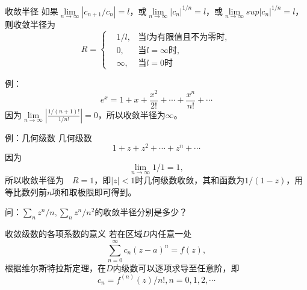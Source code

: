 \documentclass[11pt]{beamer}
\newcommand{\kong}[1][0.5]{\vspace{#1cm}}
\begin{document}
\begin{frame}{收敛半径}
如果$\lim\limits_{n \rightarrow \infty} | c_{n+1} / c_n | = l$，或$\lim\limits_{n \rightarrow \infty}　|c_n|^{1/n} = l$，或$\lim\limits_{n \rightarrow \infty}sup |c_n|^{1/n} = l$，
则收敛半径为
\begin{equation}
R = \left\{
\begin{aligned}
&1/l, 	&\text{当$l$为有限值且不为零时}, \\
&0, 	&\text{当$l=\infty$时}, \\
&\infty, &\text{当$l=0$时}
\end{aligned}
\right.
\end{equation}

\kong[1]
例：
\begin{equation}
e^x = 1 + x + \frac{x^2}{2!} + \cdots + \frac{x^n}{n!} + \cdots
\end{equation}
因为$\lim\limits_{n \rightarrow \infty} | \frac{1/(n+1)!}{1/n!}| = 0$，所以收敛半径为$\infty$。
\end{frame}

\begin{frame}{例：几何级数}
几何级数
\begin{equation}
1 + z + z^2 + \cdots + z^n + \cdots
\end{equation}
因为
\begin{equation}
\lim\limits_{n \rightarrow \infty} 1/1 = 1,
\end{equation}
所以收敛半径为　$R=1$，即$ |z|<1$时几何级数收敛，其和函数为$1/(1-z)$，用等比数列前$n$项和取极限即可得到。

\kong[0.5]
问：$\sum_n z^n/n, \sum_n z^n/n^2$的收敛半径分别是多少？
\end{frame}

\begin{frame}{收敛级数的各项系数的意义}
若在区域$D$内任意一处
\begin{equation}
\sum_{n=0}^{\infty} c_n (z-a)^n = f(z),
\end{equation}
根据维尔斯特拉斯定理，在$D$内级数可以逐项求导至任意阶，即
\begin{equation}
c_n = f^{(n)}(z)/n!, n=0,1,2,\cdots
\end{equation}
\end{frame}
\end{document}
